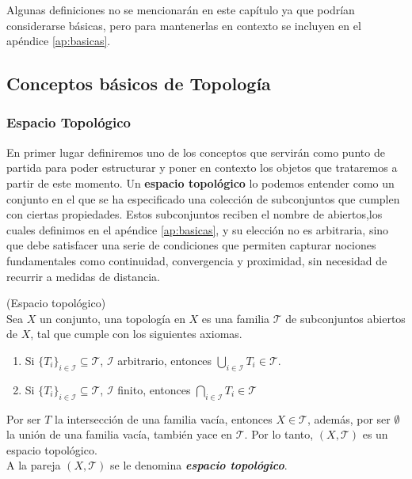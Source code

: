 Algunas definiciones no se mencionarán en este capítulo ya que podrían considerarse básicas, pero para mantenerlas en contexto se incluyen en el apéndice \ref{ap:basicas}.


\subsection{Conceptos básicos de Topología}

\subsubsection{Espacio Topológico}
En primer lugar definiremos uno de los conceptos que servirán como punto de partida para poder estructurar y poner en contexto los objetos que trataremos a partir de este momento. Un \textbf{espacio topológico} lo podemos entender como un conjunto en el que se ha especificado una colección de subconjuntos que cumplen con ciertas propiedades. Estos subconjuntos reciben el nombre de abiertos,los cuales definimos en el apéndice \ref{ap:basicas}, y su elección no es arbitraria, sino que debe satisfacer una serie de condiciones que permiten capturar nociones fundamentales como continuidad, convergencia y proximidad, sin necesidad de recurrir a medidas de distancia.


\begin{definition}(Espacio topológico)
    \\Sea $X$ un conjunto, una topología en $X$ es una familia $\mathcal{T}$ de subconjuntos abiertos de $X$, tal que cumple con los siguientes axiomas.
    \begin{enumerate}
        \item Si $\{T_i\}_{i \in \mathcal{I}} \subseteq \mathcal{T}$, $\mathcal{I}$ arbitrario, entonces \(\displaystyle \bigcup_{i \in \mathcal{I}} T_i \in \mathcal{T}\).
        \item Si $\{T_i\}_{i \in \mathcal{I}} \subseteq \mathcal{T}$, $\mathcal{I}$ finito, entonces $\displaystyle \bigcap_{i \in \mathcal{I}} T_i \in \mathcal{T}$
    \end{enumerate}
    Por ser $T$ la intersección de una familia vacía, entonces $X \in \mathcal{T}$, además, por ser $\emptyset$ la unión de una familia vacía, también yace en $\mathcal{T}$. Por lo tanto, $(X, \mathcal{T})$ es un espacio topológico.
    \\ A la pareja $(X,\mathcal{T})$ se le denomina \textbf{\textit{espacio topológico}}.
\end{definition}

